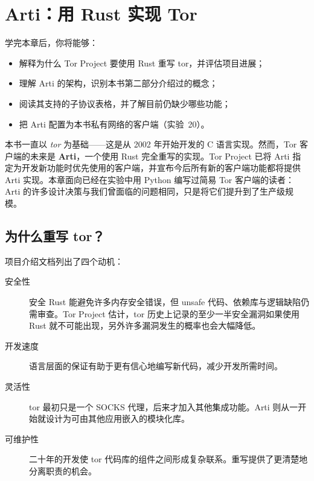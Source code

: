 \chapter{Arti：用 Rust 实现 Tor}\label{cap:30-arti}

\begin{obiettivi}
学完本章后，你将能够：
\begin{itemize}[nosep]
  \item 解释为什么 Tor Project 要使用 Rust 重写 tor，并评估项目进展；
  \item 理解 Arti 的架构，识别本书第二部分介绍过的概念；
  \item 阅读其支持的子协议表格，并了解目前仍缺少哪些功能；
  \item 把 Arti 配置为本书私有网络的客户端（实验~20）。
\end{itemize}
\end{obiettivi}

本书一直以 \emph{tor} 为基础——这是从 2002 年开始开发的 C 语言实现。然而，Tor 客户端的未来是 \textbf{Arti}，一个使用 Rust 完全重写的实现。Tor Project 已将 Arti 指定为开发新功能时优先使用的客户端，并宣布今后所有新的客户端功能都将提供 Arti 实现。本章面向已经在实验中用 Python 编写过简易 Tor 客户端的读者：Arti 的许多设计决策与我们曾面临的问题相同，只是将它们提升到了生产级规模。

\section{为什么重写 tor？}\label{sec:arti-perche}

项目介绍文档列出了四个动机：
\begin{description}
  \item[安全性] 安全 Rust 能避免许多内存安全错误，但 unsafe 代码、依赖库与逻辑缺陷仍需审查。Tor Project 估计，tor 历史上记录的至少一半安全漏洞如果使用 Rust 就不可能出现，另外许多漏洞发生的概率也会大幅降低。
  \item[开发速度] 语言层面的保证有助于更有信心地编写新代码，减少开发所需时间。
  \item[灵活性] tor 最初只是一个 SOCKS 代理，后来才加入其他集成功能。Arti 则从一开始就设计为可由其他应用嵌入的模块化库。
  \item[可维护性] 二十年的开发使 tor 代码库的组件之间形成复杂联系。重写提供了更清楚地分离职责的机会。
\end{description}

